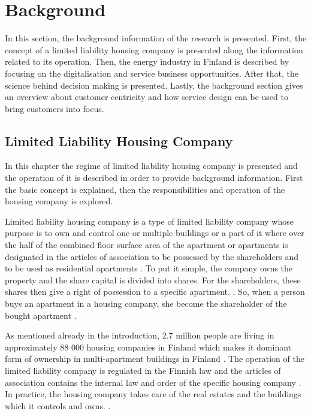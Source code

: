 \chapter{Background}
\label{chapter:background} 

In this section, the background information of the research is presented. First, the concept of a limited liability housing company is presented along the information related to its operation. Then, the energy industry in Finland is described by focusing on the digitalisation and service business opportunities. After that, the science behind decision making is presented. Lastly, the background section gives an overview about customer centricity and how service design can be used to bring customers into focus.

\section{Limited Liability Housing Company}

In this chapter the regime of limited liability housing company is presented and the operation of it is described in order to provide background information. First the basic concept is explained, then the responsibilities and operation of the housing company is explored.

Limited liability housing company is a type of limited liability company whose purpose is to own and control one or multiple buildings or a part of it where over the half of the combined floor surface area of the apartment or apartments is designated in the articles of association to be possessed by the shareholders and to be used as residential apartments \parencite{LLHA:2}. To put it simple, the company owns the property and the share capital is divided into shares. For the shareholders, these shares then give a right of possession to a specific apartment. \parencite{Lujanen:2017}. So, when a person buys an apartment in a housing company, she become the shareholder of the bought apartment \parencite{YIT}.

As mentioned already in the introduction, 2.7 million people are living in approximately 88 000 housing companies in Finland which makes it dominant form of ownership in multi-apartment buildings in Finland \parencite{REMF, Stats, Lujanen:2017}. The operation of the limited liability company is regulated in the Finnish law and the articles of association contains the internal law and order of the specific housing company \parencite{YIT}. In practice, the housing company takes care of the real estates and the buildings which it controls and owns. \parencite{LLHA:2}. 

